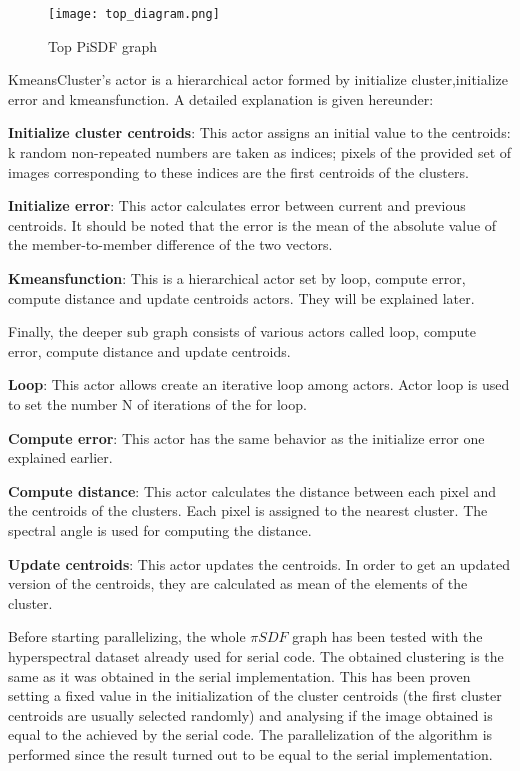 	
	 \begin{figure}[H]
        \texttt{[image: top\_diagram.png]} 
        \centering 
        \caption{Top PiSDF graph}         
        \label{fig:systemArch}
    \end{figure}
	
	 
KmeansCluster's actor is a hierarchical actor formed by initialize cluster,initialize error and kmeansfunction. A detailed explanation is given hereunder:


\setlength\parindent{24pt}\textbf{Initialize cluster centroids}: This actor assigns an initial value to the centroids: k random non-repeated numbers are taken as indices; 
pixels of the provided set of images corresponding to these indices are the first centroids of the clusters.

\setlength\parindent{24pt}\textbf{Initialize error}: This actor calculates error between current and previous centroids. It should be noted that the error is the mean of the absolute value of the member-to-member difference of the two vectors.

\setlength\parindent{24pt}\textbf{Kmeansfunction}: This is a hierarchical actor set by loop, compute error, compute distance and update centroids actors. They will be explained later.

Finally, the deeper sub graph consists of various actors called loop, compute error, compute distance and update centroids.

\setlength\parindent{24pt}\textbf{Loop}: This actor allows create an iterative loop among actors. Actor loop is used to set the number N of iterations of the for loop.

\setlength\parindent{24pt}\textbf{Compute error}: This actor has the same behavior as the initialize error one explained earlier.

\setlength\parindent{24pt}\textbf{Compute distance}: This actor calculates the distance between each pixel and the centroids of the clusters. Each pixel is assigned to the nearest cluster. The spectral angle is used for computing the distance.

\setlength\parindent{24pt}\textbf{Update centroids}: This actor updates the centroids. In order to get an updated version of the centroids, they are calculated as mean of the elements of the cluster.


   Before starting parallelizing, the whole $\pi SDF$ graph has been tested with the hyperspectral dataset already used for serial code. The obtained clustering is the same as it was obtained in the serial implementation. This has been proven setting a fixed value in the initialization of the cluster centroids (the first cluster centroids are usually selected randomly) and analysing if the image obtained is equal to the achieved by the serial code. The parallelization of the algorithm is performed since the result turned out to be equal to the serial implementation.




	 
	
	
	
	

